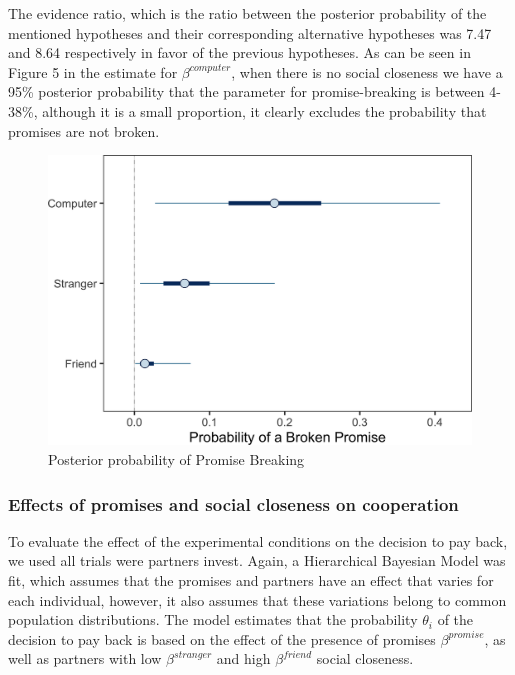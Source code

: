 \documentclass[12pt,]{article}
\begin{document}
The evidence ratio, which is the ratio between the posterior probability
of the mentioned hypotheses and their corresponding alternative
hypotheses was 7.47 and 8.64 respectively in favor of the previous
hypotheses. As can be seen in Figure 5 in the estimate for
\(\beta^{computer}\), when there is no social closeness we have a 95\%
posterior probability that the parameter for promise-breaking is between
4-38\%, although it is a small proportion, it clearly excludes the
probability that promises are not broken.

\begin{figure}

{\centering \includegraphics[width=0.8\linewidth]{article_english_files/figure-latex/fig3-1} 

}

\caption{Posterior probability of Promise Breaking}\label{fig:fig3}
\end{figure}

\hypertarget{effects-of-promises-and-social-closeness-on-cooperation}{%
\subsubsection{Effects of promises and social closeness on
cooperation}\label{effects-of-promises-and-social-closeness-on-cooperation}}

To evaluate the effect of the experimental conditions on the decision to
pay back, we used all trials were partners invest. Again, a Hierarchical
Bayesian Model was fit, which assumes that the promises and partners
have an effect that varies for each individual, however, it also assumes
that these variations belong to common population distributions. The
model estimates that the probability \(\theta_i\) of the decision to pay
back is based on the effect of the presence of promises
\(\beta^{promise}\), as well as partners with low \(\beta^{stranger}\)
and high \(\beta^{friend}\) social closeness.
\end{document}

